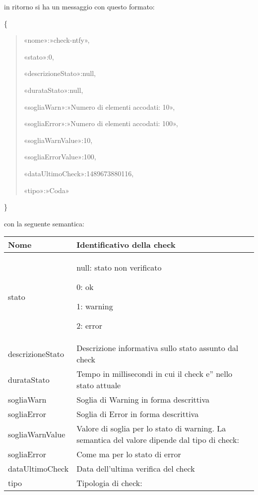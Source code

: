 \documentclass[letterpaper,10pt,italian]{sphinxmanual}
\begin{document}
in ritorno si ha un messaggio con questo formato:

\{
\begin{quote}

«nome»:»check-ntfy»,

«stato»:0,

«descrizioneStato»:null,

«durataStato»:null,

«sogliaWarn»:»Numero di elementi accodati: 10»,

«sogliaError»:»Numero di elementi accodati: 100»,

«sogliaWarnValue»:10,

«sogliaErrorValue»:100,

«dataUltimoCheck»:1489673880116,

«tipo»:»Coda»
\end{quote}

\}

con la seguente semantica:


\begin{savenotes}\sphinxattablestart
\centering
\begin{tabulary}{\linewidth}[t]{|T|T|}
\hline

Nome
&
Identificativo della check
\\
\hline
stato
&
null: stato non verificato

0: ok

1: warning

2: error
\\
\hline
descrizioneStato
&
Descrizione informativa sullo
stato assunto dal check
\\
\hline
durataStato
&
Tempo in millisecondi in cui il
check e” nello stato attuale
\\
\hline
sogliaWarn
&
Soglia di Warning in forma
descrittiva
\\
\hline
sogliaError
&
Soglia di Error in forma
descrittiva
\\
\hline
sogliaWarnValue
&
Valore di soglia per lo stato di
warning. La semantica del valore
dipende dal tipo di check:
\\
\hline
sogliaError
&
Come  ma per lo
stato di error
\\
\hline
dataUltimoCheck
&
Data dell’ultima verifica del
check
\\
\hline
tipo
&
Tipologia di check:
\\
\hline
\end{tabulary}
\par
\sphinxattableend\end{savenotes}



\renewcommand{\indexname}{Indice}
\printindex
\end{document}
